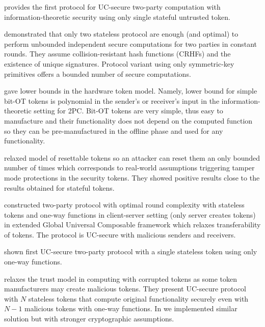 \documentclass[
  digital, %
  twoside, %
  table,   %
  lof,     %
  lot,     %
]{fithesis3}
\theoremstyle{definition}
\theoremstyle{remark}
\begin{document}
\cite{DKM11} provides the first protocol for UC-secure two-party computation with information-theoretic security using only single stateful untrusted token.

\cite{CKSYZ14} demonstrated that only two stateless protocol are enough (and optimal) to perform unbounded independent secure computations for two parties in constant rounds.
They assume collision-resistant hash functions (CRHFs) and the existence of unique signatures. Protocol variant using only symmetric-key primitives offers a bounded number of secure computations.

\cite{AAGPR13} gave lower bounds in the hardware token model. Namely, lower bound for simple bit-OT tokens is polynomial in the sender's or receiver's input in the information-theoretic setting for 2PC. Bit-OT tokens are very simple, thus easy to manufacture and their functionality does not depend on the computed function so they can be pre-manufactured in the offline phase and used for any functionality.

\cite{DKMN15} relaxed model of resettable tokens so an attacker can reset them an only bounded number of times which corresponds to real-world assumptions triggering tamper mode protections in the security tokens. They showed positive results close to the results obtained for stateful tokens. 

\cite{HPV16} constructed two-party protocol with optimal round complexity with stateless tokens and one-way functions in client-server setting (only server creates tokens) in extended Global Universal Composable framework which relaxes transferability of tokens. The protocol is UC-secure with malicious senders and receivers.

\cite{DKMN15b} shown first UC-secure two-party protocol with a single stateless token using only one-way functions.

\cite{CCOV17} relaxes the trust model in computing with corrupted tokens as some token manufacturers may create malicious tokens. They present UC-secure protocol with $N$ stateless tokens that compute original functionality securely even with $N-1$ malicious tokens with one-way functions. In \cite{2017-ccs-mavroudis} we implemented similar solution but with stronger cryptographic assumptions.


\end{document}
